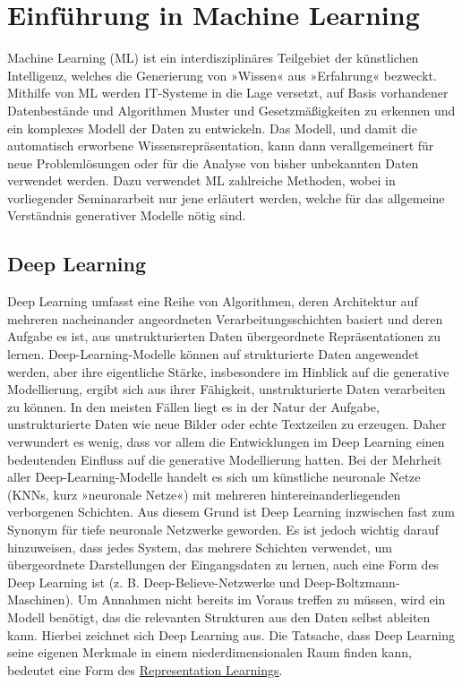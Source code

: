 \section{Einführung in Machine Learning}\label{Machine Learning}
Machine Learning (ML) ist ein interdisziplinäres Teilgebiet der künstlichen Intelligenz, welches die Generierung von »Wissen« aus »Erfahrung« bezweckt. Mithilfe von ML werden IT-Systeme in die Lage versetzt, auf Basis vorhandener Datenbestände und Algorithmen Muster und Gesetzmäßigkeiten zu erkennen und ein komplexes Modell der Daten zu entwickeln. Das Modell, und damit die automatisch erworbene Wissensrepräsentation, kann dann verallgemeinert für neue Problemlösungen oder für die Analyse von bisher unbekannten Daten verwendet werden. Dazu verwendet ML zahlreiche Methoden, wobei in vorliegender Seminararbeit nur jene erläutert werden, welche für das allgemeine Verständnis generativer Modelle nötig sind.

\subsection{Deep Learning}\label{Deep Learning}
Deep Learning umfasst eine Reihe von Algorithmen, deren Architektur auf mehreren nacheinander angeordneten Verarbeitungsschichten basiert und deren Aufgabe es ist, aus unstrukturierten Daten übergeordnete Repräsentationen zu lernen.
Deep-Learning-Modelle können auf strukturierte Daten angewendet werden, aber ihre eigentliche Stärke, insbesondere im Hinblick auf die generative Modellierung, ergibt sich aus ihrer Fähigkeit, unstrukturierte Daten verarbeiten zu können. In den meisten Fällen liegt es in der Natur der Aufgabe, unstrukturierte Daten wie neue Bilder oder echte Textzeilen zu erzeugen. Daher verwundert es wenig, dass vor allem die Entwicklungen im Deep Learning einen bedeutenden Einfluss auf die generative Modellierung hatten\cite{fos19}.
Bei der Mehrheit aller Deep-Learning-Modelle handelt es sich um künstliche neuronale Netze (KNNs, kurz »neuronale Netze«) mit mehreren hintereinanderliegenden verborgenen Schichten. Aus diesem Grund ist Deep Learning inzwischen fast zum Synonym für tiefe neuronale Netzwerke geworden. Es ist jedoch wichtig darauf hinzuweisen, dass jedes System, das mehrere Schichten verwendet, um übergeordnete Darstellungen der Eingangsdaten zu lernen, auch eine Form des Deep Learning ist (z. B. Deep-Believe-Netzwerke und Deep-Boltzmann-Maschinen).
Um Annahmen nicht bereits im Voraus treffen zu müssen, wird ein Modell benötigt, das die relevanten Strukturen aus den Daten selbst ableiten kann. Hierbei zeichnet sich Deep Learning aus. Die Tatsache, dass Deep Learning seine eigenen Merkmale in einem niederdimensionalen Raum finden kann, bedeutet eine Form des \hyperref[Representation Learning]{Representation Learnings}\cite{goodl16}.

